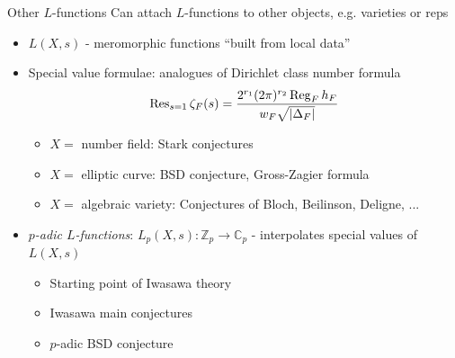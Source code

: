 \documentclass[10pt]{beamer}
\newcommand{\Z}{\mathbb{Z}}
\newcommand{\C}{\mathbb{C}}
\DeclareMathOperator{\Reg}{Reg}
\begin{document}
\begin{frame}{Other $L$-functions}
Can attach $L$-functions to other objects, e.g. varieties or reps\pause
  \begin{itemize}[leftmargin=2pt]

\item $L(X,s)$ - meromorphic functions ``built from local data''\pause 
\item Special value formulae: analogues of Dirichlet class number
  formula
      \[ \Res_{s=1}\zeta_{F}(s)= \frac{2^{r_{1}}(2\pi)^{r_{2}}\Reg_{F}h_{F}
        }{w_{F}\sqrt{|\Delta_{F}|}} \]\pause
\begin{itemize}
\item $X = $ number field: Stark conjectures \pause
  \item $X = $ elliptic curve: BSD conjecture, Gross-Zagier formula\pause
  \item $X = $ algebraic variety: Conjectures of Bloch, Beilinson,
    Deligne, ... \pause 
  \end{itemize}
\item \emph{$p$-adic $L$-functions}: 
  $L_{p}(X,s) \colon \Z_{p}\to \C_{p}$ - interpolates special values of
  $L(X,s)$ \pause 
\begin{itemize}
\item Starting point of Iwasawa theory\pause
\item Iwasawa main conjectures \pause
\item $p$-adic BSD conjecture
\end{itemize} 
\end{itemize}

\end{frame}
\end{document}
